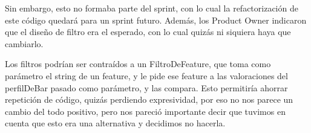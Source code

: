 Sin embargo, esto no formaba parte del sprint, con lo cual la refactorización de este código quedará para un sprint futuro. Además, los Product Owner indicaron que el diseño de filtro era el esperado, con lo cual quizás ni siquiera haya que cambiarlo.

Los filtros podrían ser contraídos a un FiltroDeFeature, que toma como parámetro el string de un feature, y le pide ese feature a las valoraciones del perfilDeBar pasado como parámetro, y las compara. Esto permitiría ahorrar repetición de código, quizás perdiendo expresividad, por eso no nos parece un cambio del todo positivo, pero nos pareció importante decir que tuvimos en cuenta que esto era una alternativa y decidimos no hacerla.


